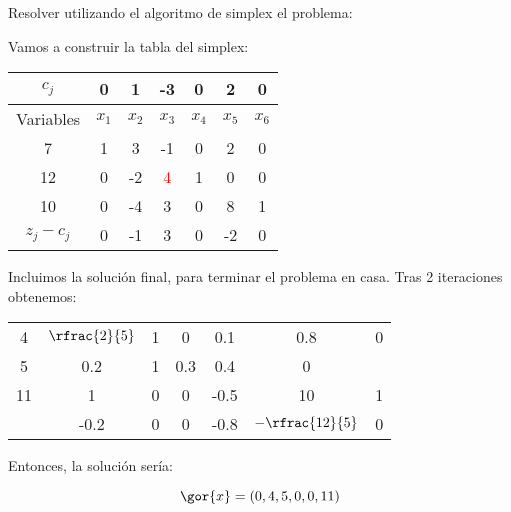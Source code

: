 \begin{problem}[1]

Resolver utilizando el algoritmo de simplex el problema:

\begin{ioprob}
\end{ioprob}

\solution

Vamos a construir la tabla del simplex:


\begin{table}[hbtp]
\centering
\begin{tabular}{c|cccccc}
$c_j$&0&1&-3&0&2&0\\\hline
Variables & $x_1$&$x_2$&$x_3$&$x_4$&$x_5$&$x_6$\\\hline
7&1&3&-1&0&2&0\\
12&0&-2&\textcolor{red}{4}&1&0&0\\
10&0&-4&3&0&8&1\\\hline
$z_j - c_j$ & 0&-1&3&0&-2&0
\end{tabular}
\end{table}

Incluimos la solución final, para terminar el problema en casa.
%
Tras 2 iteraciones obtenemos:


\begin{table}[hbtp]
\centering
\begin{tabular}{c|cccccc}
\hline
4&$\rfrac{2}{5}$&1&0&0.1&0.8&0\\
5&0.2&1&0.3&0.4&0\\
11&1&0&0&-0.5&10&1\\\hline
&-0.2&0&0&-0.8&$-\rfrac{12}{5}$&0
\end{tabular}
\end{table}

Entonces, la solución sería:

\[
\gor{x} = (0,4,5,0,0,11)
\]
\end{problem}

\begin{problem}

\solution
{}
\end{problem}

